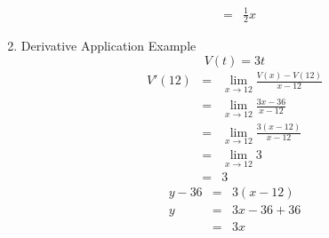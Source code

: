 \documentclass{article}
\begin{document}
\begin{enumerate}
\begin{eqnarray}
        &=& \frac{1}{2}x
    \end{eqnarray}
    \item Derivative Application Example
    $$V(t) = 3t$$
    \begin{eqnarray}
        V'(12) &=& \lim_{x \to 12}{\frac{V(x) - V(12)}{x - 12}} \\
               &=& \lim_{x \to 12}{\frac{3x - 36}{x - 12}} \\
               &=& \lim_{x \to 12}{\frac{3(x - 12)}{x - 12}} \\
               &=& \lim_{x \to 12}{3} \\
               &=& 3
    \end{eqnarray}
    \begin{eqnarray}
        y - 36 &=& 3(x - 12) \\
        y &=& 3x - 36 + 36 \\
          &=& 3x \\
    \end{eqnarray}
\end{enumerate}
\end{document}

